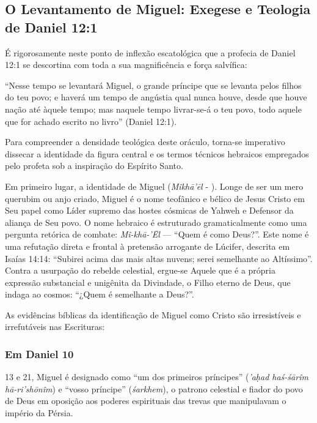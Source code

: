 \documentclass[11pt,a4paper,openany]{book}
\begin{document}
\subsection{O Levantamento de Miguel: Exegese e Teologia de Daniel 12:1}


É rigorosamente neste ponto de inflexão escatológica que a profecia de Daniel 12:1 se descortina com toda a sua magnificência e força salvífica:

``Nesse tempo se levantará Miguel, o grande príncipe que se levanta pelos filhos do teu povo; e haverá um tempo de angústia qual nunca houve, desde que houve nação até àquele tempo; mas naquele tempo livrar-se-á o teu povo, todo aquele que for achado escrito no livro'' (Daniel 12:1).

Para compreender a densidade teológica deste oráculo, torna-se imperativo dissecar a identidade da figura central e os termos técnicos hebraicos empregados pelo profeta sob a inspiração do Espírito Santo.

Em primeiro lugar, a identidade de Miguel (\textit{Mîkhā’ēl} - ). Longe de ser um mero querubim ou anjo criado, Miguel é o nome teofânico e bélico de Jesus Cristo em Seu papel como Líder supremo das hostes cósmicas de Yahweh e Defensor da aliança de Seu povo. O nome hebraico é estruturado gramaticalmente como uma pergunta retórica de combate: \textit{Mî-khā-’Ēl} — ``Quem é como Deus?''. Este nome é uma refutação direta e frontal à pretensão arrogante de Lúcifer, descrita em Isaías 14:14: ``Subirei acima das mais altas nuvens; serei semelhante ao Altíssimo''. Contra a usurpação do rebelde celestial, ergue-se Aquele que é a própria expressão substancial e unigênita da Divindade, o Filho eterno de Deus, que indaga ao cosmos: ``¿Quem é semelhante a Deus?''.

As evidências bíblicas da identificação de Miguel como Cristo são irresistíveis e irrefutáveis nas Escrituras:

\subsubsection*{Em Daniel 10}
13 e 21, Miguel é designado como ``um dos primeiros príncipes'' (\textit{’aḥad haś-śārîm hā-ri’shōnîm}) e ``vosso príncipe'' (\textit{śarkhem}), o patrono celestial e fiador do povo de Deus em oposição aos poderes espirituais das trevas que manipulavam o império da Pérsia.
\end{document}
